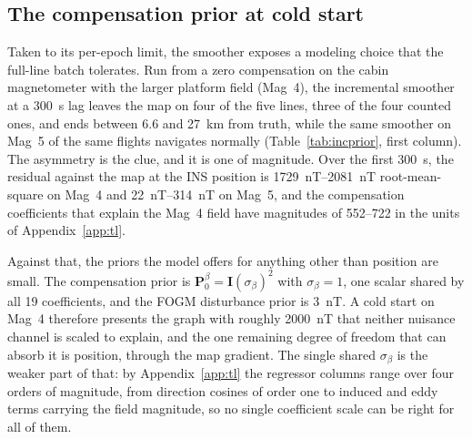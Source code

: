 
\subsection{The compensation prior at cold start}\label{sec:coldprior}
Taken to its per-epoch limit, the smoother exposes a modeling choice that the
full-line batch tolerates. Run from a zero compensation on the cabin
magnetometer with the larger platform field (Mag~4), the incremental smoother at
a \SI{300}{\second} lag leaves the map on four of the five lines, three of the
four counted ones, and ends between \SI{6.6}{} and \SI{27}{\kilo\meter} from
truth, while the same smoother on Mag~5 of the same flights navigates normally
(Table~\ref{tab:incprior}, first column). The asymmetry is the clue, and it is
one of magnitude. Over the first \SI{300}{\second}, the residual against the map
at the INS position is \SIrange{1729}{2081}{\nano\tesla} root-mean-square on
Mag~4 and \SIrange{22}{314}{\nano\tesla} on Mag~5, and the compensation
coefficients that explain the Mag~4 field have magnitudes of
\numrange{552}{722} in the units of Appendix~\ref{app:tl}.

Against that, the priors the model offers for anything other than position are
small. The compensation prior is $\mathbf{P}_0^{\beta}=\mathbf{I}(\sigma_{\beta})^2$
with $\sigma_{\beta}=1$, one scalar shared by all \num{19} coefficients, and the
FOGM disturbance prior is \SI{3}{\nano\tesla}. A cold start on Mag~4 therefore
presents the graph with roughly \SI{2000}{\nano\tesla} that neither nuisance
channel is scaled to explain, and the one remaining degree of freedom that can
absorb it is position, through the map gradient. The single shared
$\sigma_{\beta}$ is the weaker part of that: by Appendix~\ref{app:tl} the
regressor columns range over four orders of magnitude, from direction cosines of
order one to induced and eddy terms carrying the field magnitude, so no single
coefficient scale can be right for all of them.

